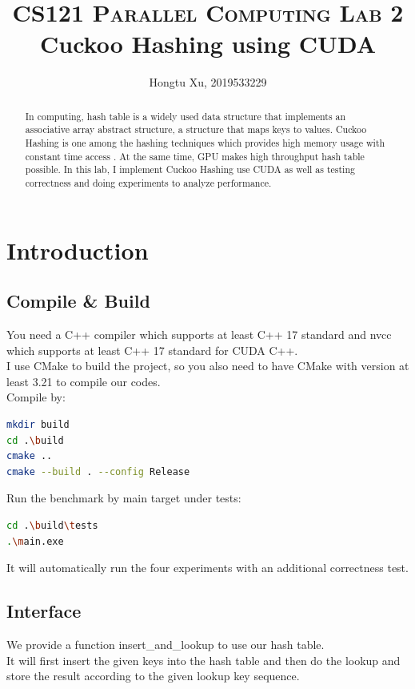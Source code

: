 \documentclass[10pt,twocolumn,letterpaper]{article}
\title{
		\usefont{OT1}{bch}{b}{n}
		\normalfont \normalsize \textsc{CS121 Parallel Computing Lab 2} \\ [10pt]
		\huge Cuckoo Hashing using CUDA \\
}
\author[]{Hongtu Xu, 2019533229}
\affil[]{xuht1@shanghaitech.edu.cn}
\begin{document}
\maketitle

\begin{abstract}

In computing, hash table is a widely used data structure that implements an associative array abstract structure, a structure that maps keys to values. Cuckoo Hashing is one among the hashing techniques which provides high memory usage with constant time access \cite{Chadalavada2017ImprovingCH}. At the same time, GPU makes high throughput hash table possible. In this lab, I implement Cuckoo Hashing use CUDA as well as testing correctness and doing experiments to analyze performance.

\end{abstract} 

\section{Introduction}
\subsection{Compile \& Build}

You need a C++ compiler which supports at least C++ 17 standard and nvcc which supports at least C++ 17 standard for CUDA C++.\\
I use CMake to build the project, so you also need to have CMake with version at least 3.21 to compile our codes.\\
Compile by:
\begin{lstlisting}[language=bash]
mkdir build
cd .\build
cmake ..
cmake --build . --config Release
\end{lstlisting}
Run the benchmark by main target under tests:
\begin{lstlisting}[language=bash]
cd .\build\tests
.\main.exe
\end{lstlisting}
It will automatically run the four experiments with an additional correctness test.

\subsection{Interface}

We provide a function insert\_and\_lookup to use our hash table. \\
It will first insert the given keys into the hash table and then do the lookup and store the result according to the given lookup key sequence.
\end{document}

